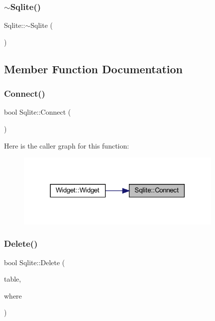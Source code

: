 \mbox{\label{class_sqlite_adc35a543dca91edc3ffb90a3825dd54a}} 
\subsubsection{\texorpdfstring{$\sim$Sqlite()}{~Sqlite()}}
{\footnotesize\ttfamily Sqlite\+::$\sim$\+Sqlite (\begin{DoxyParamCaption}{ }\end{DoxyParamCaption})}



\subsection{Member Function Documentation}
\mbox{\label{class_sqlite_aa93509c1e19a7d486f4f38ff4bc78a89}} 
\subsubsection{\texorpdfstring{Connect()}{Connect()}}
{\footnotesize\ttfamily bool Sqlite\+::\+Connect (\begin{DoxyParamCaption}{ }\end{DoxyParamCaption})}

Here is the caller graph for this function\+:
\nopagebreak
\begin{figure}[H]
\begin{center}
\leavevmode
\includegraphics[width=282pt]{class_sqlite_aa93509c1e19a7d486f4f38ff4bc78a89_icgraph}
\end{center}
\end{figure}
\mbox{\label{class_sqlite_a772711beeceff7a567192e19abccfed4}} 
\subsubsection{\texorpdfstring{Delete()}{Delete()}}
{\footnotesize\ttfamily bool Sqlite\+::\+Delete (\begin{DoxyParamCaption}\item[{Q\+String}]{table,  }\item[{Q\+String}]{where }\end{DoxyParamCaption})}

